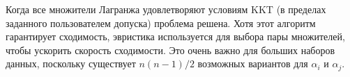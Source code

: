 \documentclass[12pt,a4paper]{article}
\begin{document}
Когда все множители Лагранжа удовлетворяют условиям KKT (в пределах заданного пользователем допуска) проблема решена. Хотя этот алгоритм гарантирует сходимость, эвристика используется для выбора пары множителей, чтобы ускорить скорость сходимости. Это очень важно для больших наборов данных, поскольку существует $n(n-1)/2$ возможных вариантов для $\alpha_{i}$ и $\alpha_{j}$.
\end{document}
